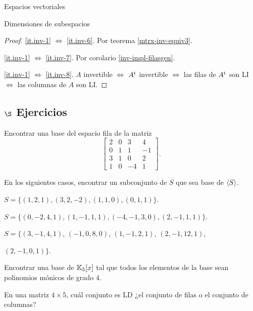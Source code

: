 \begin{chapter}{Espacios vectoriales}
\begin{section}{Dimensiones de subespacios}
\begin{proof}
    \ref{it.inv-1} $\Leftrightarrow$ \ref{it.inv-6}. Por teorema \ref{mtrx-inv-equiv3}.
    
    \ref{it.inv-1} $\Leftrightarrow$ \ref{it.inv-7}. Por corolario \ref{inv-impl-filasgen}.
    
    \ref{it.inv-1} $\Leftrightarrow$ \ref{it.inv-8}. $A$ invertible $\Leftrightarrow$ $A^{\operatorname{t}}$ invertible $\Leftrightarrow$  las filas de $A^{\operatorname{t}}$ son LI $\Leftrightarrow$  las columnas de $A$ son LI. 
\end{proof}
    
\subsection*{$\S$ Ejercicios}
    \begin{enumex}
        \item Encontrar una base del espacio fila de la matriz 
        $$
        \begin{bmatrix}
            2&0&3&4\\ 0&1&1&-1 \\ 3&1&0&2 \\ 1&0&-4&1
        \end{bmatrix}.
        $$
        \item En  los siguientes casos, encontrar un subconjunto de $S$ que sea base de $\langle S \rangle$.
            \begin{enumex}
                \item $S= \{(1,2,1), (3,2,-2), (1,1,0), (0,1,1)\}$.
                \item $S= \{(0,-2,4,1), (1,-1,1,1),(-4, -1, 3, 0), (2,-1,1,1)\}$.
                \item $S= \{(3,-1,4,1)$, $(-1, 0, 8, 0)$, $(1,-1,2,1)$, $(2, -1, 12, 1)$, 
                
                \qquad$(2,-1,0,1)\}$.
            \end{enumex}
        \item Encontrar una base de $\mathbb K_5[x]$ tal que todos los elementos de la base sean  polinomios mónicos de grado $4$. 
        \item En una matriz $4 \times 5$,  cuál conjunto es LD ¿el conjunto de filas o el conjunto de columnas?
    \end{enumex}
    \end{section}



    \end{chapter}